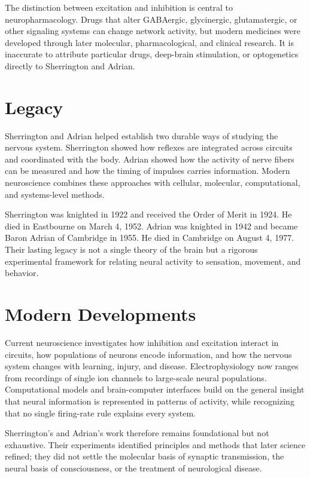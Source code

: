 The distinction between excitation and inhibition is central to neuropharmacology. Drugs that alter GABAergic, glycinergic, glutamatergic, or other signaling systems can change network activity, but modern medicines were developed through later molecular, pharmacological, and clinical research. It is inaccurate to attribute particular drugs, deep-brain stimulation, or optogenetics directly to Sherrington and Adrian.

\section{Legacy}

Sherrington and Adrian helped establish two durable ways of studying the nervous system. Sherrington showed how reflexes are integrated across circuits and coordinated with the body. Adrian showed how the activity of nerve fibers can be measured and how the timing of impulses carries information. Modern neuroscience combines these approaches with cellular, molecular, computational, and systems-level methods.

Sherrington was knighted in 1922 and received the Order of Merit in 1924. He died in Eastbourne on March 4, 1952. Adrian was knighted in 1942 and became Baron Adrian of Cambridge in 1955. He died in Cambridge on August 4, 1977. Their lasting legacy is not a single theory of the brain but a rigorous experimental framework for relating neural activity to sensation, movement, and behavior.

\section{Modern Developments}

Current neuroscience investigates how inhibition and excitation interact in circuits, how populations of neurons encode information, and how the nervous system changes with learning, injury, and disease. Electrophysiology now ranges from recordings of single ion channels to large-scale neural populations. Computational models and brain-computer interfaces build on the general insight that neural information is represented in patterns of activity, while recognizing that no single firing-rate rule explains every system.

Sherrington's and Adrian's work therefore remains foundational but not exhaustive. Their experiments identified principles and methods that later science refined; they did not settle the molecular basis of synaptic transmission, the neural basis of consciousness, or the treatment of neurological disease.

